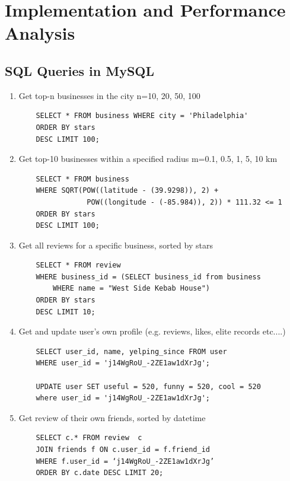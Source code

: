 \documentclass[runningheads]{llncs}
\begin{document}
\section{Implementation and Performance Analysis}

\subsection{SQL Queries in MySQL}
\begin{enumerate}
    \item Get top-n businesses in the city n=10, 20, 50, 100
    \begin{verbatim}
    SELECT * FROM business WHERE city = 'Philadelphia' 
    ORDER BY stars
    DESC LIMIT 100;
    \end{verbatim}

    
    \item Get top-10 businesses within a specified radius m=0.1, 0.5, 1, 5, 10 km

    \begin{verbatim}
    SELECT * FROM business 
    WHERE SQRT(POW((latitude - (39.9298)), 2) + 
                POW((longitude - (-85.984)), 2)) * 111.32 <= 1  
    ORDER BY stars 
    DESC LIMIT 100;
    \end{verbatim}
    
    \item Get all reviews for a specific business, sorted by stars
    \begin{verbatim}
    SELECT * FROM review 
    WHERE business_id = (SELECT business_id from business
        WHERE name = "West Side Kebab House") 
    ORDER BY stars 
    DESC LIMIT 10;
    \end{verbatim}
    
    \item Get and update user's own profile (e.g. reviews, likes, elite records etc....)
    \begin{verbatim}
    SELECT user_id, name, yelping_since FROM user 
    WHERE user_id = 'j14WgRoU_-2ZE1aw1dXrJg';

    UPDATE user SET useful = 520, funny = 520, cool = 520
    where user_id = 'j14WgRoU_-2ZE1aw1dXrJg';
    \end{verbatim}

    \item Get review of their own friends, sorted by datetime
    \begin{verbatim}
    SELECT c.* FROM review  c 
    JOIN friends f ON c.user_id = f.friend_id 
    WHERE f.user_id = ‘j14WgRoU_-2ZE1aw1dXrJg’ 
    ORDER BY c.date DESC LIMIT 20;
    \end{verbatim}


\end{enumerate}
\end{document}
